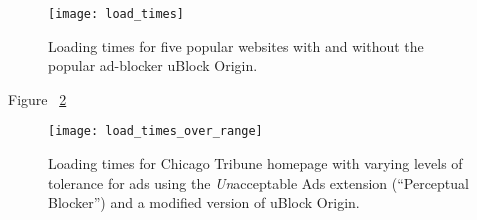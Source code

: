 \begin{figure}[h]
\centering
\texttt{[image: load\_times]}
\caption{Loading times for five popular websites with and without the popular ad-blocker uBlock Origin.}
\label{fig:load_times}
\end{figure}

Figure ~\ref{fig:load_times_over_range}

\begin{figure}[h]
\centering
\texttt{[image: load\_times\_over\_range]}
\caption{Loading times for Chicago Tribune homepage with varying levels of tolerance for ads using the \textit{Un}acceptable Ads extension (``Perceptual Blocker'') and a modified version of uBlock Origin.}
\label{fig:load_times_over_range}
\end{figure}